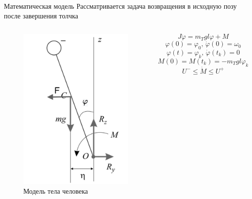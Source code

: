 \documentclass[10pt]{beamer}
\begin{document}
\begin{frame}{Математическая модель}
	Рассматривается задача возвращения в исходную позу после завершения толчка
	\begin{columns}
		\begin{figure}[h!]
			\includegraphics[width=0.55\linewidth]{body_1.pdf}
			\caption{Модель тела человека}
		\end{figure}

		\[
			J\ddot{\varphi}=m_Tgl\varphi+M
		\]
		\[
			\varphi(0)=\varphi_0,\, \dot{\varphi}(0)=\omega_0
		\]
		\[
			\varphi(t)=\varphi_k,\, \dot{\varphi}(t_k)=0
		\]
		\[
			M(0)=M(t_k)=-m_Tgl\varphi_k
		\]
		\[
			U^-\leq\dot{M}\leq U^+
		\]
	\end{columns}
\end{frame}
\end{document}
